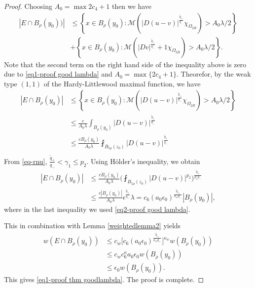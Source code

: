 \documentclass[a4paper,10pt]{amsart}
\newcommand{\f}{\frac}
\newcommand{\Om}{\Omega}
\begin{document}
\begin{proof}
	    Choosing $A_0= \max{2c_4 +1}$ then we have
	    $$
	    \begin{aligned}
	    |E\cap B_{\rho}(y_0))|&\leq \left\{x\in B_{\rho}(y_0):\mathcal{M}(|D(u-v)|^{\f{\tilde{q}_+}{q_-}}\chi_{\Om_{2R}})>A_0\lambda/2\right\}\\
	    &+\left\{x\in B_{\rho}(y_0):\mathcal{M}(|Dv|^{\f{\tilde{q}_+}{q_-}}+1\chi_{\Om_{2R}})>A_0\lambda/2\right\}.	    
	    \end{aligned}
	    $$
	    Note that the second term on the right hand side of the inequality above is zero due to \eqref{eq1-proof good lambda} and $A_0= \max\{2c_4 +1\}$. Theorefor, by the weak type $(1,1)$ of the Hardy-Littlewood maximal function, we have 
	    $$
	    \begin{aligned}
	    |E\cap B_{\rho}(y_0)|&\leq \left\{x\in B_{\rho}(y_0):\mathcal{M}(|D(u-v)|^{\f{\tilde{q}_+}{q_-}}\chi_{\Om_{2R}})>A_0\lambda/2\right\}\\
	    &\leq \f{c}{A_0\lambda} \int_{B_{\rho}(y_0)}|D(u-v)|^{\f{\tilde{q}_+}{q_-}}\\
	    &\leq \f{cB_{\rho}(y_0)}{A_0\lambda} \fint_{B_{5\rho}(z_0)}|D(u-v)|^{\f{\tilde{q}_+}{q_-}}\\
	    \end{aligned}
	    $$
	    From \eqref{eq-rnu}, $\f{\tilde{q}_+}{q_-}<\gamma_1\leq p_2$. Using H\"older's inequality, we obtain
	    $$
	    \begin{aligned}
	    |E\cap B_{\rho}(y_0)|
	    &\leq \f{cB_{\rho}(y_0)}{A_0\lambda} \Big(\fint_{B_{5\rho}(z_0)}|D(u-v)|^{p_2}\Big)^{\f{\tilde{q}_+}{p_2q_-}}\\
	    &\leq \f{c|B_{\rho}(y_0)|}{A_0\lambda} \epsilon^{\f{\tilde{q}_+}{q_-}}\lambda=c_6(a_0\epsilon_0)^{\f{\tilde{q}_+}{\kappa_wq_-}}|B_{\rho}(y_0)|,
	    \end{aligned}
	    $$
	    where in the last inequality we used \eqref{eq2-proof good lambda}.
	    
	    
	    This in combination with Lemma \ref{weightedlemma2} yields
	    $$
	    \begin{aligned}
	    w(E\cap B_{\rho}(y_0))&\leq c_w \Big[c_6(a_0\epsilon_0)^{\f{\tilde{q}_+}{\kappa_wq_-}}\Big]^{\kappa_w}w(B_{\rho}(y_0))\\
	    &\leq c_wc_6^{\kappa}a_0\epsilon_0 w(B_{\rho}(y_0))\\
	    &\leq \epsilon_0 w(B_{\rho}(y_0)).
	    \end{aligned}
	    $$
	    This gives \eqref{eq1-proof thm goodlambda}. The proof is complete.
	\end{proof}
	
\end{document}
